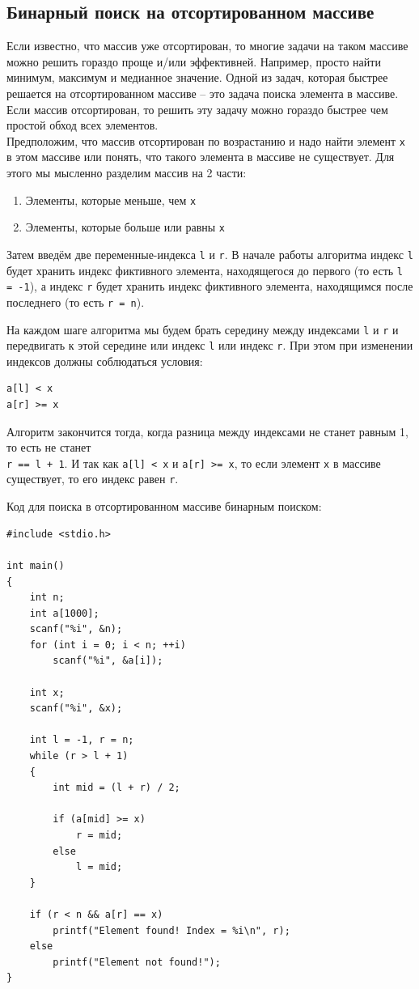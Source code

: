 \documentclass{article}
\begin{document}
\subsection*{Бинарный поиск на отсортированном массиве}
Если известно, что массив уже отсортирован, то многие задачи на таком массиве можно решить гораздо проще и/или эффективней. Например, просто найти минимум, максимум и медианное значение. Одной из задач, которая быстрее решается на отсортированном массиве -- это задача поиска элемента в массиве. Если массив отсортирован, то решить эту задачу можно гораздо быстрее чем простой обход всех элементов. \\

Предположим, что массив отсортирован по возрастанию и надо найти элемент \texttt{x} в этом массиве или понять, что такого элемента в массиве не существует. Для этого мы мысленно разделим массив на  2 части:
\begin{enumerate}
\item Элементы, которые меньше, чем \texttt{x}
\item Элементы, которые больше или равны \texttt{x}
\end{enumerate}

Затем введём две переменные-индекса \texttt{l} и \texttt{r}. В начале работы алгоритма индекс \texttt{l} будет хранить индекс фиктивного элемента, находящегося до первого (то есть \texttt{l = -1}), а индекс \texttt{r} будет хранить индекс фиктивного элемента, находящимся после последнего (то есть \texttt{r = n}). 

На каждом шаге алгоритма мы будем брать середину между индексами \texttt{l} и \texttt{r} и передвигать к этой середине или индекс \texttt{l} или индекс \texttt{r}. При этом при изменении индексов должны соблюдаться условия:
\begin{verbatim}
a[l] < x
a[r] >= x
\end{verbatim}

Алгоритм закончится тогда, когда разница между индексами не станет равным 1, то есть не станет \\
\texttt{r == l + 1}. И так как \texttt{a[l] < x} и \texttt{a[r] >= x}, то если элемент \texttt{x} в массиве существует, то его индекс равен \texttt{r}.



Код для поиска в отсортированном массиве бинарным поиском:
\begin{lstlisting}
#include <stdio.h>

int main() 
{
    int n;
    int a[1000];
    scanf("%i", &n);
    for (int i = 0; i < n; ++i)
        scanf("%i", &a[i]);
        
    int x;
    scanf("%i", &x);
    
    int l = -1, r = n;
    while (r > l + 1) 
    {
        int mid = (l + r) / 2;
        
        if (a[mid] >= x)
            r = mid;
        else 
            l = mid;
    }
    
    if (r < n && a[r] == x)
        printf("Element found! Index = %i\n", r);
    else
        printf("Element not found!");
}

\end{lstlisting}
\end{document}
